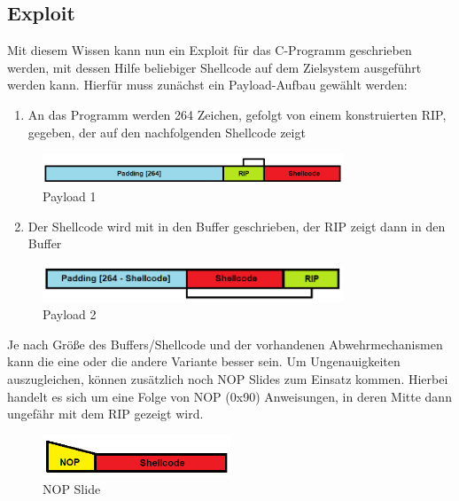 \subsection{Exploit} \label{sec:explainersub}
Mit diesem Wissen kann nun ein Exploit für das C-Programm geschrieben werden, mit dessen Hilfe beliebiger Shellcode
auf dem Zielsystem ausgeführt werden kann. Hierfür muss zunächst ein Payload-Aufbau gewählt werden:
\begin{enumerate}
    \item An das Programm werden 264 Zeichen, gefolgt von einem konstruierten RIP, gegeben, der auf den nachfolgenden Shellcode zeigt
\end{enumerate}
\begin{figure}[h]
    \centering
    \includegraphics[width=0.8\textwidth,height=0.75\textheight,keepaspectratio]{images/payload1.png}
    \caption{Payload 1}
\end{figure}

\begin{enumerate}
    \setcounter{enumi}{1}
    \item Der Shellcode wird mit in den Buffer geschrieben, der RIP zeigt dann in den Buffer
\end{enumerate}
\begin{figure}[h]
    \centering
    \includegraphics[width=0.8\textwidth,height=0.75\textheight,keepaspectratio]{images/payload2.png}
    \caption{Payload 2}
\end{figure}

Je nach Größe des Buffers/Shellcode und der vorhandenen Abwehrmechanismen kann die eine oder die andere Variante besser sein.
Um Ungenauigkeiten auszugleichen, können zusätzlich noch NOP Slides zum Einsatz kommen. Hierbei handelt es sich um eine Folge
von NOP (0x90) Anweisungen, in deren Mitte dann ungefähr mit dem RIP gezeigt wird.
\begin{figure}[h]
    \centering
    \includegraphics[width=0.5\textwidth,height=0.75\textheight,keepaspectratio]{images/nop.png}
    \caption{NOP Slide}
\end{figure}

